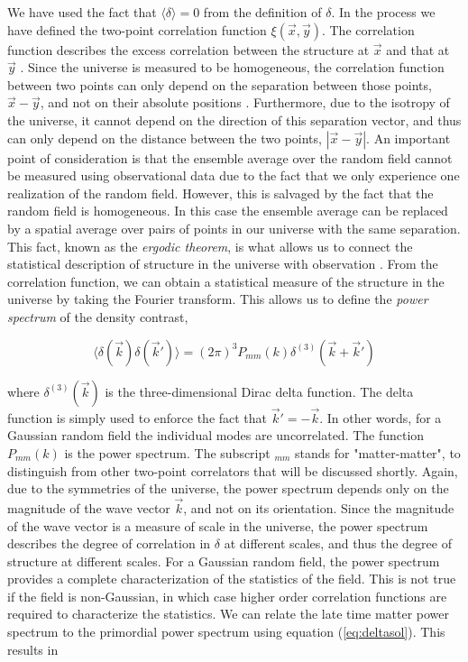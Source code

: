 \documentclass[10pt,letterpaper,final]{iopart}
\numberwithin{equation}{subsection}
\def\ni{\noindent}
\begin{document}
\ni We have used the fact that $\langle \delta \rangle = 0$ from the definition of $\delta$. In the process we have defined the two-point correlation function $\xi(\vec{x}, \vec{y})$. The correlation function describes the excess correlation between the structure at $\vec{x}$ and that at $\vec{y}$ \cite{Schneider}. Since the universe is measured to be homogeneous, the correlation function between two points can only depend on the separation between those points, $\vec{x} - \vec{y}$, and not on their absolute positions \cite{Schneider}. Furthermore, due to the isotropy of the universe, it cannot depend on the direction of this separation vector, and thus can only depend on the distance between the two points, $| \vec{x} - \vec{y} |$\cite{Schneider}. An important point of consideration is that the ensemble average over the random field cannot be measured using observational data due to the fact that we only experience one realization of the random field. However, this is salvaged by the fact that the random field is homogeneous. In this case the ensemble average can be replaced by a spatial average over pairs of points in our universe with the same separation. This fact, known as the \emph{ergodic theorem}, is what allows us to connect the statistical description of structure in the universe with observation \cite{Schneider}\cite{Weinberg}. From the correlation function, we can obtain a statistical measure of the structure in the universe by taking the Fourier transform. This allows us to define the \emph{power spectrum} of the density contrast,

\begin{equation}\label{eq:P_mm}
\langle \delta(\vec{k})\delta(\vec{k}') \rangle = (2\pi)^3 P_{mm}(k) \delta^{(3)}(\vec{k} + \vec{k}')
\end{equation}

\ni where $\delta^{(3)}(\vec{k})$ is the three-dimensional Dirac delta function. The delta function is simply used to enforce the fact that $\vec{k}' = -\vec{k}$. In other words, for a Gaussian random field the individual modes are uncorrelated. The function $P_{mm}(k)$ is the power spectrum. The subscript $_{mm}$ stands for "matter-matter", to distinguish from other two-point correlators that will be discussed shortly. Again, due to the symmetries of the universe, the power spectrum depends only on the magnitude of the wave vector $\vec{k}$, and not on its orientation. Since the magnitude of the wave vector is a measure of scale in the universe, the power spectrum describes the degree of correlation in $\delta$ at different scales, and thus the degree of structure at different scales. For a Gaussian random field, the power spectrum provides a complete characterization of the statistics of the field. This is not true if the field is non-Gaussian, in which case higher order correlation functions are required to characterize the statistics. We can relate the late time matter power spectrum to the primordial power spectrum using equation (\ref{eq:deltasol}). This results in
\end{document}
